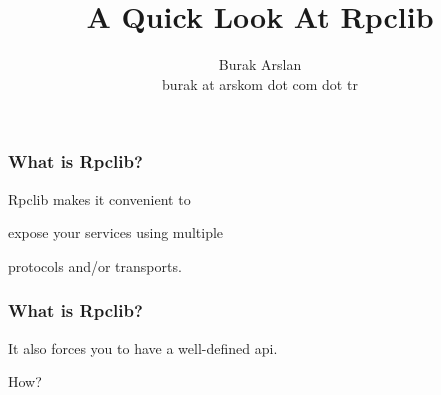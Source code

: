 \documentclass{beamer}
\title{A Quick Look At Rpclib}
\author{Burak Arslan \\ \small burak at arskom \small{dot} com \small{dot} tr}
\begin{document}
\begin{frame}
  \maketitle
\end{frame}

\begin{frame}
  \frametitle{What is Rpclib?}

  \LARGE
  \begin{center}

    Rpclib makes it convenient to

    \bigskip

    expose your services using multiple

    \bigskip

    protocols and/or transports.

  \end{center}

\end{frame}


%
%
%
%
%
%
%
%


\begin{frame}
  \frametitle{What is Rpclib?}

  \LARGE
  \begin{center}

    It also forces you to have a well-defined api.

%
%
%
%

  \end{center}

\end{frame}


\begin{frame}
\Huge
\begin{center}

  How?

\end{center}

\end{frame}
\end{document}
